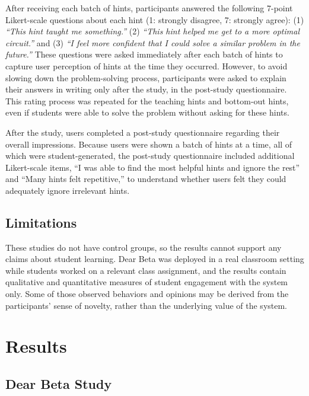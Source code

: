 After receiving each batch of hints, participants answered the following 7-point Likert-scale questions about each hint (1: strongly disagree, 7: strongly agree): (1) {\it ``This hint taught me something.''} (2) {\it ``This hint helped me get to a more optimal circuit.''} and (3) {\it ``I feel more confident that I could solve a similar problem in the future.''} These questions were asked immediately after each batch of hints to capture user perception of hints at the time they occurred. However, to avoid slowing down the problem-solving process, participants were asked to explain their answers in writing only after the study, in the post-study questionnaire. This rating process was repeated for the teaching hints and bottom-out hints, even if students were able to solve the problem without asking for these hints.

After the study, users completed a post-study questionnaire regarding their overall impressions. Because users were shown a batch of hints at a time, all of which were student-generated, the post-study questionnaire included additional Likert-scale items, ``I was able to find the most helpful hints and ignore the rest'' and ``Many hints felt repetitive,'' to understand whether users felt they could adequately ignore irrelevant hints. 

\subsection{Limitations}
These studies do not have control groups, so the results cannot support any claims about student learning. Dear Beta was deployed in a real classroom setting while students worked on a relevant class assignment, and the results contain qualitative and quantitative measures of student engagement with the system only. Some of those observed behaviors and opinions may be derived from the participants' sense of novelty, rather than the underlying value of the system. %


\section{Results}

\subsection{Dear Beta Study}


